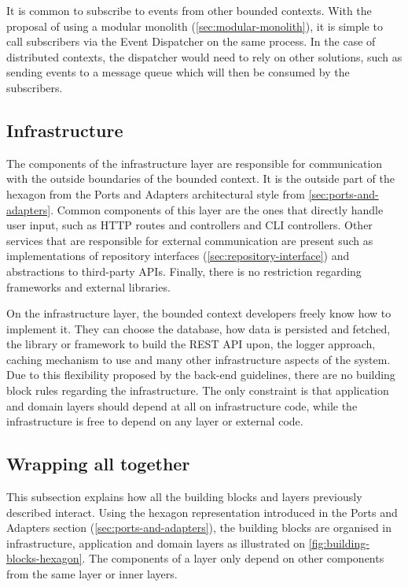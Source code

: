 It is common to subscribe to events from other bounded contexts. With the proposal of using a modular monolith (\autoref{sec:modular-monolith}), it is simple to call subscribers via the Event Dispatcher on the same process. In the case of distributed contexts, the dispatcher would need to rely on other solutions, such as sending events to a message queue which will then be consumed by the subscribers.

\subsection{Infrastructure}

The components of the infrastructure layer are responsible for communication with the outside boundaries of the bounded context. It is the outside part of the hexagon from the Ports and Adapters architectural style from \autoref{sec:ports-and-adapters}. Common components of this layer are the ones that directly handle user input, such as HTTP routes and controllers and CLI controllers. Other services that are responsible for external communication are present such as implementations of repository interfaces (\autoref{sec:repository-interface}) and abstractions to third-party APIs. Finally, there is no restriction regarding frameworks and external libraries.

On the infrastructure layer, the bounded context developers freely know how to implement it. They can choose the database, how data is persisted and fetched, the library or framework to build the REST API upon, the logger approach, caching mechanism to use and many other infrastructure aspects of the system. Due to this flexibility proposed by the back-end guidelines, there are no building block rules regarding the infrastructure. The only constraint is that application and domain layers should depend at all on infrastructure code, while the infrastructure is free to depend on any layer or external code.

\subsection{Wrapping all together}

This subsection explains how all the building blocks and layers previously described interact. Using the hexagon representation introduced in the Ports and Adapters section (\autoref{sec:ports-and-adapters}), the building blocks are organised in infrastructure, application and domain layers as illustrated on \autoref{fig:building-blocks-hexagon}. The components of a layer only depend on other components from the same layer or inner layers.

